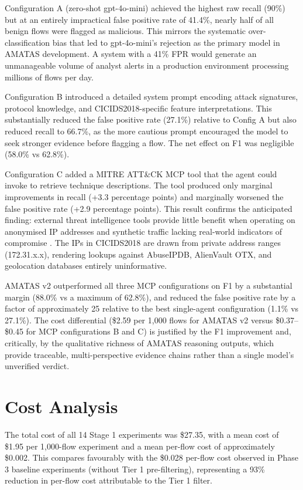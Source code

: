 Configuration A (zero-shot gpt-4o-mini) achieved the highest raw recall (90\%) but at an entirely impractical false positive rate of 41.4\%, nearly half of all benign flows were flagged as malicious. This mirrors the systematic over-classification bias that led to gpt-4o-mini's rejection as the primary model in AMATAS development. A system with a 41\% FPR would generate an unmanageable volume of analyst alerts in a production environment processing millions of flows per day.

Configuration B introduced a detailed system prompt encoding attack signatures, protocol knowledge, and CICIDS2018-specific feature interpretations. This substantially reduced the false positive rate (27.1\%) relative to Config A but also reduced recall to 66.7\%, as the more cautious prompt encouraged the model to seek stronger evidence before flagging a flow. The net effect on F1 was negligible (58.0\% vs 62.8\%).

Configuration C added a MITRE ATT\&CK MCP tool that the agent could invoke to retrieve technique descriptions. The tool produced only marginal improvements in recall (+3.3 percentage points) and marginally worsened the false positive rate (+2.9 percentage points). This result confirms the anticipated finding: external threat intelligence tools provide little benefit when operating on anonymised IP addresses and synthetic traffic lacking real-world indicators of compromise \autocite{Mukherjee2023}. The IPs in CICIDS2018 are drawn from private address ranges (172.31.x.x), rendering lookups against AbuseIPDB, AlienVault OTX, and geolocation databases entirely uninformative.

AMATAS v2 outperformed all three MCP configurations on F1 by a substantial margin (88.0\% vs a maximum of 62.8\%), and reduced the false positive rate by a factor of approximately 25 relative to the best single-agent configuration (1.1\% vs 27.1\%). The cost differential (\$2.59 per 1,000 flows for AMATAS v2 versus \$0.37--\$0.45 for MCP configurations B and C) is justified by the F1 improvement and, critically, by the qualitative richness of AMATAS reasoning outputs, which provide traceable, multi-perspective evidence chains rather than a single model's unverified verdict.

\section{Cost Analysis}
\label{sec:cost-analysis}

The total cost of all 14 Stage 1 experiments was \$27.35, with a mean cost of \$1.95 per 1,000-flow experiment and a mean per-flow cost of approximately \$0.002. This compares favourably with the \$0.028 per-flow cost observed in Phase 3 baseline experiments (without Tier 1 pre-filtering), representing a 93\% reduction in per-flow cost attributable to the Tier 1 filter.

